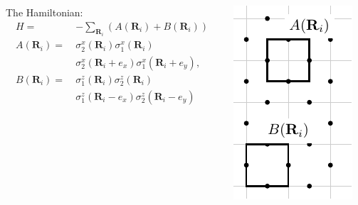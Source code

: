 \documentclass{beamer}
\renewcommand{\(}{\left(}
\renewcommand{\)}{\right)}
\renewcommand{\[}{\left[}
\renewcommand{\]}{\right]}
\begin{document}
\begin{frame}
\begin{columns}
\begin{column}{0.62\textwidth}
            The Hamiltonian: 
                \begin{align*}
                    H =& -\sum_{\bm R_i} \(A(\bm R_i)  + B(\bm R_i) \)\\
                    A(\bm R_i) = \ &\sigma^x_{2}(\bm R_i)\sigma^x_{1}(\bm R_i) \\  & \sigma^x_{2}  (\bm R_i + e_x)\sigma^x_{1} (\bm R_i+ e_y), \\
                    B(\bm R_i) = \ & \sigma^z_{1} (\bm R_i)\sigma^z_{2} (\bm R_i) \\ &\sigma^z_{1} (\bm R_i - e_x)\sigma^z_{2} (\bm R_i - e_y) 
                \end{align*}
        \end{column}
        \begin{column}{0.38\textwidth}
            \centering
            \includegraphics[scale = 1, trim=0 0 0 0, clip]{elementry_loops.pdf}

        \end{column}
    \end{columns}
\end{frame}
\end{document}
